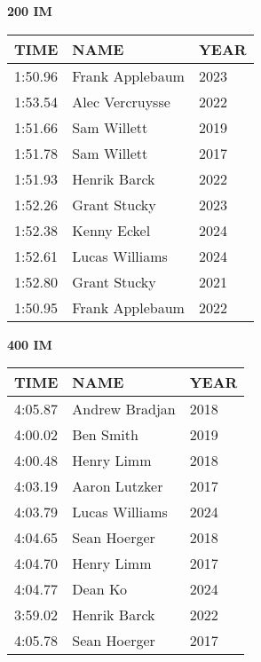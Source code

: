 \begin{table}[H]
\centering
\begin{minipage}[t]{0.48\textwidth}
\centering
\textbf{200 IM}\\[0.1cm]
\begin{tabular}{@{}p{1.8cm}p{2.8cm}p{1.2cm}@{}}
\hline
    \textbf{TIME} & \textbf{NAME} & \textbf{YEAR} \\
\hline
    1:50.96 & Frank Applebaum & 2023 \\
    1:53.54 & Alec Vercruysse & 2022 \\
    1:51.66 & Sam Willett & 2019 \\
    1:51.78 & Sam Willett & 2017 \\
    1:51.93 & Henrik Barck & 2022 \\
    1:52.26 & Grant Stucky & 2023 \\
    1:52.38 & Kenny Eckel & 2024 \\
    1:52.61 & Lucas Williams & 2024 \\
    1:52.80 & Grant Stucky & 2021 \\
    1:50.95 & Frank Applebaum & 2022 \\
\hline
\end{tabular}
\end{minipage}\hfill
\begin{minipage}[t]{0.48\textwidth}
\centering
\textbf{400 IM}\\[0.1cm]
\begin{tabular}{@{}p{1.8cm}p{2.8cm}p{1.2cm}@{}}
\hline
    \textbf{TIME} & \textbf{NAME} & \textbf{YEAR} \\
\hline
    4:05.87 & Andrew Bradjan & 2018 \\
    4:00.02 & Ben Smith & 2019 \\
    4:00.48 & Henry Limm & 2018 \\
    4:03.19 & Aaron Lutzker & 2017 \\
    4:03.79 & Lucas Williams & 2024 \\
    4:04.65 & Sean Hoerger & 2018 \\
    4:04.70 & Henry Limm & 2017 \\
    4:04.77 & Dean Ko & 2024 \\
    3:59.02 & Henrik Barck & 2022 \\
    4:05.78 & Sean Hoerger & 2017 \\
\hline
\end{tabular}
\end{minipage}
\end{table}

